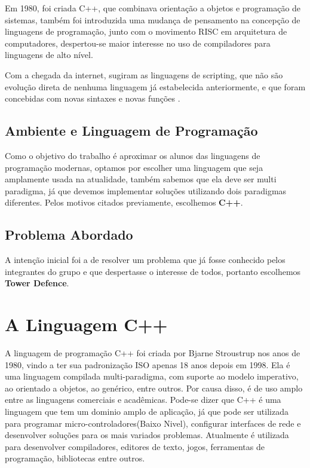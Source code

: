 \documentclass[rel_mlp]{iiufrgs}
\begin{document}
Em 1980, foi criada C++, que combinava orientação a objetos e programação de sistemas, também foi introduzida uma mudança de pensamento na concepção de linguagens de programação, junto com o movimento RISC em arquitetura de computadores, despertou-se maior interesse no uso de compiladores para linguagens de alto nível.

Com a chegada da internet, sugiram as linguagens de scripting, que não são evolução direta de nenhuma linguagem já estabelecida anteriormente, e que foram concebidas com novas sintaxes e novas funções \cite{ceruzzi1998history}.

\section{Ambiente e Linguagem de Programação}
Como o objetivo do trabalho é aproximar os alunos das linguagens de programação modernas, optamos por escolher uma linguagem que seja amplamente usada na atualidade, também sabemos que ela deve ser multi paradigma, já que devemos implementar soluções utilizando dois paradigmas diferentes.
Pelos motivos citados previamente, escolhemos \textbf{C++}.

\section{Problema Abordado}
A intenção inicial foi a de resolver um problema que já fosse conhecido pelos integrantes do grupo e que despertasse o interesse de todos, portanto escolhemos \textbf {Tower Defence}.

\chapter{A Linguagem C++} \label{C++}

A linguagem de programação C++ foi criada por Bjarne Stroustrup nos anos de 1980, vindo a ter sua padronização ISO apenas 18 anos depois em 1998. Ela é uma linguagem compilada multi-paradigma, com suporte ao modelo imperativo, ao orientado a objetos, ao genérico, entre outros. Por causa disso, é de uso amplo entre as linguagens comerciais e acadêmicas. Pode-se dizer que C++ é uma linguagem que tem um dominio amplo de aplicação, já que pode ser utilizada para programar micro-controladores(Baixo Nivel), configurar interfaces de rede e desenvolver soluções para os mais variados problemas. Atualmente é utilizada para desenvolver compiladores, editores de texto, jogos, ferramentas de programação, bibliotecas entre outros\cite{stroustrup2000c++}.
\end{document}

